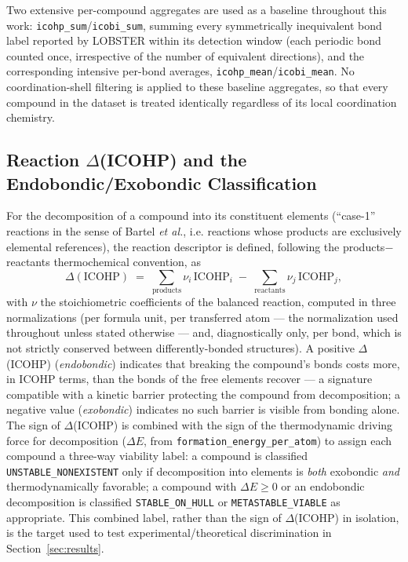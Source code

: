\documentclass[journal=jpccck,manuscript=article]{achemso}
\begin{document}
Two extensive per-compound aggregates are used as a baseline throughout this
work: \texttt{icohp\_sum}/\texttt{icobi\_sum}, summing every symmetrically
inequivalent bond label reported by LOBSTER within its detection window
(each periodic bond counted once, irrespective of the number of equivalent
directions), and the corresponding intensive per-bond averages,
\texttt{icohp\_mean}/\texttt{icobi\_mean}. No coordination-shell filtering is
applied to these baseline aggregates, so that every compound in the dataset
is treated identically regardless of its local coordination chemistry.

\subsection{Reaction $\Delta$(ICOHP) and the Endobondic/Exobondic
Classification}
\label{sec:delta-icohp}

For the decomposition of a compound into its constituent elements
(``case-1'' reactions in the sense of Bartel \emph{et al.},\cite{bartel2019}
i.e. reactions whose products are exclusively elemental references), the
reaction descriptor is defined, following the products$-$reactants
thermochemical convention, as
\begin{equation}
  \Delta(\text{ICOHP}) \;=\; \sum_{\text{products}} \nu_i\, \text{ICOHP}_i
  \;-\; \sum_{\text{reactants}} \nu_j\, \text{ICOHP}_j ,
  \label{eq:delta-icohp}
\end{equation}
with $\nu$ the stoichiometric coefficients of the balanced reaction, computed
in three normalizations (per formula unit, per transferred atom --- the
normalization used throughout unless stated otherwise --- and, diagnostically
only, per bond, which is not strictly conserved between differently-bonded
structures). A positive $\Delta$(ICOHP) (\emph{endobondic}) indicates that
breaking the compound's bonds costs more, in ICOHP terms, than the bonds of
the free elements recover --- a signature compatible with a kinetic barrier
protecting the compound from decomposition; a negative value
(\emph{exobondic}) indicates no such barrier is visible from bonding alone.
The sign of
$\Delta$(ICOHP) is combined with the sign of the thermodynamic driving force
for decomposition ($\Delta E$, from \texttt{formation\_energy\_per\_atom}) to
assign each compound a three-way viability label: a compound is classified
\texttt{UNSTABLE\_NONEXISTENT} only if decomposition into elements is
\emph{both} exobondic \emph{and} thermodynamically favorable; a compound with
$\Delta E \geq 0$ or an endobondic decomposition is classified
\texttt{STABLE\_ON\_HULL} or \texttt{METASTABLE\_VIABLE} as appropriate. This
combined label, rather than the sign of $\Delta$(ICOHP) in isolation, is the
target used to test experimental/theoretical discrimination in
Section~\ref{sec:results}.
\end{document}
